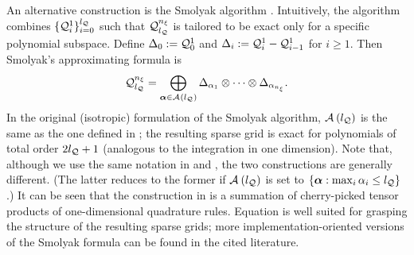 An alternative construction is the Smolyak algorithm \cite{maitre2010, eldred2008}.
Intuitively, the algorithm combines $\{ \quadrature{1}{i} \}_{i = 0}^\nqlevel$ such that $\quadrature$ is tailored to be exact only for a specific polynomial subspace.
Define $\Delta_0 := \quadrature{1}{0}$ and $\Delta_i := \quadrature{1}{i} - \quadrature{1}{i - 1}$ for $i \geq 1$.
Then Smolyak's approximating formula is
\begin{equation} \xelab{smolyak-sparse-grid}
  \quadrature = \bigoplus_{\multiindex \in \quadratureMultiindexSet{\nqlevel}} \Delta_{\alpha_1} \otimes \cdots \otimes \Delta_{\alpha_\nvars}.
\end{equation}
In the original (isotropic) formulation of the Smolyak algorithm, $\mathcal{A}_{}\left( {l_\mathcal{Q}} \right)$ is the same as the one defined in ; the resulting sparse grid is exact for polynomials of total order $2 {l_\mathcal{Q}} + 1$ (analogous to the integration in one dimension).
Note that, although we use the same notation in  and , the two constructions are generally different.
(The latter reduces to the former if $\mathcal{A}_{}\left( {l_\mathcal{Q}} \right)$ is set to $\{ \bm{\alpha}: \max_i \alpha_i \leq {l_\mathcal{Q}} \}$.)
It can be seen that the construction in  is a summation of cherry-picked tensor products of one-dimensional quadrature rules.
Equation  is well suited for grasping the structure of the resulting sparse grids; more implementation-oriented versions of the Smolyak formula can be found in the cited literature.
